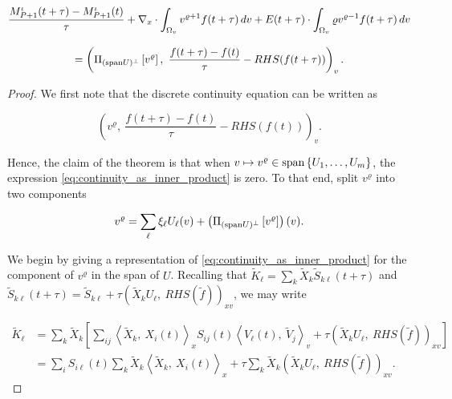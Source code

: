 \begin{remark}
\begin{enumerate}
            \begin{multline}
                \frac{M_{P+1}^\iota (t + \tau) - M_{P+1}^\iota (t)}{\tau} 
                + \nabla_x \cdot \int_{\Omega_v} v^{\varrho + 1} f(t + \tau) \,dv 
                + E(t + \tau) \cdot \int_{\Omega_v} \varrho v^{\varrho - 1} f(t + \tau) \,dv \\[2ex] 
                = \left( 
                    \Pi_{(\spn U)^\perp} \left[ v^\varrho \right],\ 
                    \frac{f(t + \tau) - f(t)}{\tau} - RHS (f(t + \tau))
                \right)_v . 
            \end{multline}
    \end{enumerate}
\end{remark}

\begin{proof}
    We first note that the discrete continuity equation can be written as 

    \begin{equation}\label{eq:continuity_as_inner_product}
        \left( v^\varrho,\ \frac{f(t+\tau) - f(t)}{\tau} - RHS (f(t)) \right)_v . 
    \end{equation}

    Hence, the claim of the theorem is that when 
    $v \mapsto v^\varrho \in \text{span} \left\{ U_1, \ldots, U_m \right\}$, 
    the expression \ref{eq:continuity_as_inner_product} is zero. To that end, 
    split $v^\varrho$ into two components
    
    \begin{equation}\label{eq:split_v_varrho}
        v^\varrho = \sum_\ell \xi_\ell U_\ell (v) 
            + \left( \Pi_{(\text{span} U)^\perp} \left[ v^\varrho \right] \right) (v) . 
    \end{equation}
    
    We begin by giving a representation of \ref{eq:continuity_as_inner_product} 
    for the component of $v^\varrho$ in the span of $U$. 
    Recalling that 
    $\widetilde{ K }_\ell = \sum_k \widetilde{ X }_k \widetilde{ S }_{k \ell} (t + \tau)$ 
    and 
    $\widetilde{ S }_{k \ell} (t + \tau) 
    = \widetilde{ S }_{k \ell} + \tau \left( \widetilde{ X }_k U_\ell,\ RHS (\widetilde{ f }) \right)_{x v}$, 
    we may write 

    \begin{equation}\label{eq:K_tilde_ell}
        \begin{split}
            \widetilde{ K }_\ell &= 
            \sum_k \widetilde{ X }_k \left[ 
                \sum_{i j} \left\langle \widetilde{ X }_k,\ X_i (t) \right\rangle_x
                    S_{i j} (t) \left\langle V_\ell (t),\ \widetilde{ V }_j \right\rangle_v
                + \tau \left( \widetilde{ X }_k U_\ell,\ RHS (\widetilde{ f }) \right)_{x v}
             \right] \\
            &= \sum_i S_{i \ell} (t) \sum_k 
                \widetilde{ X }_k \left\langle \widetilde{ X }_k,\ X_i (t) \right\rangle_x
                + \tau \sum_k \widetilde{ X }_k 
                    \left( \widetilde{ X }_k U_\ell,\ RHS (\widetilde{ f }) \right)_{x v} . 
        \end{split}
    \end{equation}


\end{proof}
